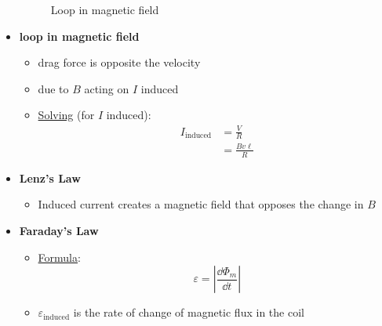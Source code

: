 \documentclass{article}
\begin{document}
\begin{itemize}
\begin{figure}[H]
        \caption{Loop in magnetic field}
      \end{figure}
      \item \textbf{loop in magnetic field}
        \begin{itemize}
          \item drag force is opposite the velocity
          \item due to $B$ acting on $I$ induced
          \item \underline{Solving} (for $I$ induced):
            \begin{align*}
              I_{\mathrm{induced}} &= \frac{V}{R}\\
               & = \frac{Bv\ell}{R}
            \end{align*}
        \end{itemize} 
      \item \textbf{Lenz's Law}
        \begin{itemize}
          \item Induced current creates a magnetic field that opposes the change in $B$
        \end{itemize} 
      \item \textbf{Faraday's Law}
        \begin{itemize}
          \item \underline{Formula}:
            $$
            \varepsilon = \left|\frac{\dd \Phi_m}{\dd t}\right|
            $$
          \item $\varepsilon_{\mathrm{induced}}$ is the rate of change of magnetic flux in the coil
          \begin{figure}[H]
            \centering

\end{figure}
\end{itemize}
\end{itemize}
\end{document}
